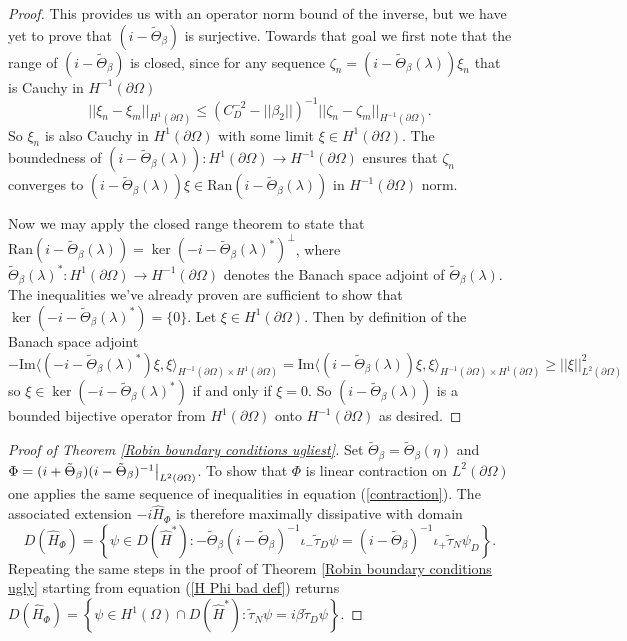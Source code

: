 \documentclass{article}
\numberwithin{equation}{section}
\begin{document}
\begin{proof}
    This provides us with an operator norm bound of the inverse, but we have yet to prove that $(i-\tilde \Theta_\beta)$ is surjective. Towards that goal we first note that the range of $(i-\tilde \Theta_\beta)$ is closed, since for any sequence $\zeta_n=(i-\tilde \Theta_\beta(\lambda))\xi_n$ that is Cauchy in $H^{-1}(\partial \Omega)$
    \begin{equation}
        ||\xi_n-\xi_m||_{H^1(\partial \Omega)} \leq \left(C_D^{-2}-||\beta_2||\right)^{-1}||\zeta_n - \zeta_m||_{H^{-1}(\partial \Omega)}.
    \end{equation}
    So $\xi_n$ is also Cauchy in $H^{1}(\partial \Omega)$ with some limit $\xi\in H^1(\partial \Omega)$. The boundedness of $(i-\tilde \Theta_\beta(\lambda)):H^1(\partial \Omega)\to H^{-1}(\partial \Omega)$ ensures that $\zeta_n$ converges to $(i-\tilde \Theta_\beta(\lambda))\xi\in \text{Ran}(i-\tilde \Theta_\beta(\lambda))$ in $H^{-1}(\partial \Omega)$ norm.
    \par
    Now we may apply the closed range theorem to state that $\text{Ran}(i-\tilde\Theta_\beta(\lambda))=\ker(-i-\tilde\Theta_\beta(\lambda)^*)^\perp$, where $\tilde{\Theta}_\beta(\lambda)^*:H^{1}(\partial \Omega)\to H^{-1}(\partial \Omega)$ denotes the Banach space adjoint of $\tilde{\Theta}_\beta(\lambda)$. The inequalities we've already proven are sufficient to show that $\ker(-i-\tilde\Theta_\beta(\lambda)^*)=\{0\}$. Let $\xi \in H^1(\partial \Omega)$. Then by definition of the Banach space adjoint
    \begin{equation}
        -\text{Im}\langle(-i-\tilde\Theta_\beta(\lambda)^*)\xi,\xi\rangle_{H^{-1}(\partial \Omega)\times H^1(\partial \Omega)}=\text{Im}\langle(i-\tilde\Theta_\beta(\lambda))\xi,\xi\rangle_{H^{-1}(\partial \Omega)\times H^{1}(\partial \Omega)}\geq||\xi||_{L^2(\partial \Omega)}^2 
    \end{equation}
    so $\xi \in \ker(-i-\tilde\Theta_\beta(\lambda)^*)$ if and only if $\xi=0$. So $(i-\tilde \Theta_\beta(\lambda))$ is a bounded bijective operator from $H^{1}(\partial \Omega)$ onto $H^{-1}(\partial \Omega)$ as desired.
\end{proof}
\begin{proof}[Proof of Theorem \ref{Robin boundary conditions ugliest}] Set $\tilde{\Theta}_\beta=\tilde{\Theta}_\beta(\eta)$ and $\Phi=(i+\tilde{\Theta}_\beta)(i-\tilde{\Theta}_\beta)^{-1}\big{|}_{L^2(\partial \Omega)}$. To show that $\Phi$ is linear contraction on $L^2(\partial \Omega)$ one applies the same sequence of inequalities in equation (\ref{contraction}). The associated extension $-i\hat{H}_\Phi$ is therefore maximally dissipative with domain 
\begin{equation}
        D(\hat{H}_\Phi)= \left\{\psi \in D(\hat{H}^*): -\tilde{\Theta}_\beta (i- \tilde{\Theta}_\beta)^{-1}\iota_-\tilde{\tau}_D \psi=(i - \tilde{\Theta}_\beta)^{-1}\iota_+ \tilde{\tau}_N \psi_D \right\}.
    \end{equation}
Repeating the same steps in the proof of Theorem \ref{Robin boundary conditions ugly} starting from equation (\ref{H Phi bad def}) returns $D(\hat{H}_\Phi)=  \left\{\psi \in H^1(\Omega)\cap D(\hat{H}^*):\tilde\tau_N \psi=i \beta \tilde\tau_D \psi \right\}$.
\end{proof}
\end{document}
